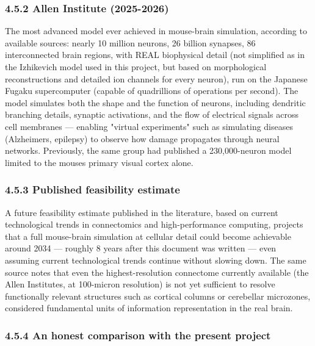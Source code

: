 \documentclass[
  english,
]{article}
\begin{document}
\subsubsection{4.5.2 Allen Institute (2025-2026)}\label{allen-institute-2025-2026}

The most advanced model ever achieved in mouse-brain simulation, according to available sources: nearly 10 million neurons, 26 billion synapses, 86 interconnected brain regions, with REAL biophysical detail (not simplified as in the Izhikevich model used in this project, but based on morphological reconstructions and detailed ion channels for every neuron), run on the Japanese Fugaku supercomputer (capable of quadrillions of operations per second). The model simulates both the shape and the function of neurons, including dendritic branching details, synaptic activations, and the flow of electrical signals across cell membranes --- enabling "virtual experiments" such as simulating diseases (Alzheimer\textquotesingle s, epilepsy) to observe how damage propagates through neural networks. Previously, the same group had published a 230,000-neuron model limited to the mouse\textquotesingle s primary visual cortex alone.

\subsubsection{4.5.3 Published feasibility estimate}\label{published-feasibility-estimate}

A future feasibility estimate published in the literature, based on current technological trends in connectomics and high-performance computing, projects that a full mouse-brain simulation at cellular detail could become achievable around 2034 --- roughly 8 years after this document was written --- even assuming current technological trends continue without slowing down. The same source notes that even the highest-resolution connectome currently available (the Allen Institute\textquotesingle s, at 100-micron resolution) is not yet sufficient to resolve functionally relevant structures such as cortical columns or cerebellar microzones, considered fundamental units of information representation in the real brain.

\subsubsection{4.5.4 An honest comparison with the present project}\label{an-honest-comparison-with-the-present-project}
\end{document}
